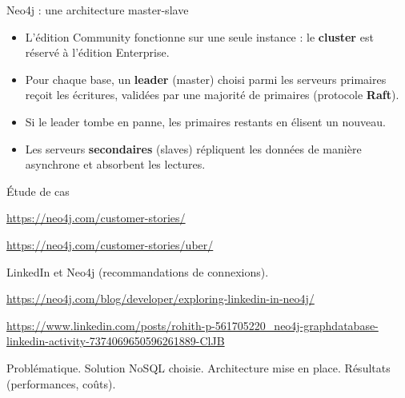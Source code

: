\begin{frame}{Neo4j : une architecture master-slave}
    \begin{itemize}
        \item L'édition Community fonctionne sur une seule instance : le
              \textbf{cluster} est réservé à l'édition Enterprise.
        \item Pour chaque base, un \textbf{leader} (master) choisi parmi les
              serveurs primaires reçoit les écritures, validées par une majorité
              de primaires (protocole \textbf{Raft}).
        \item Si le leader tombe en panne, les primaires restants en élisent un
              nouveau.
        \item Les serveurs \textbf{secondaires} (slaves) répliquent les données
              de manière asynchrone et absorbent les lectures.
    \end{itemize}

\end{frame}

\begin{frame}{Étude de cas}

    \url{https://neo4j.com/customer-stories/}

    \url{https://neo4j.com/customer-stories/uber/}

    LinkedIn et Neo4j (recommandations de connexions).

    \url{https://neo4j.com/blog/developer/exploring-linkedin-in-neo4j/}

    \url{https://www.linkedin.com/posts/rohith-p-561705220_neo4j-graphdatabase-linkedin-activity-7374069650596261889-ClJB}

    Problématique. Solution NoSQL choisie. Architecture mise en place. Résultats
    (performances, coûts).


\end{frame}
